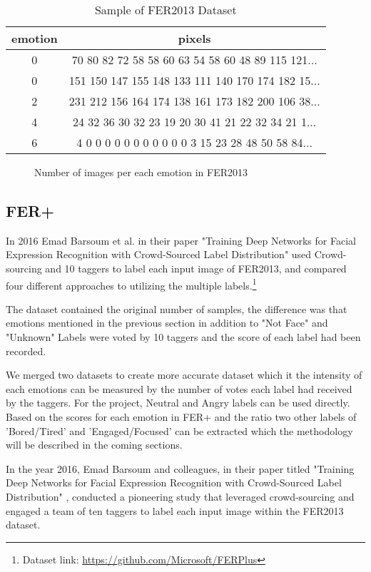 \begin{table}
	\centering
	\caption{Sample of FER2013 Dataset}
	\begin{tabular}{| c | c |}
		
		\hline
		emotion &	pixels \\
		\hline
		0 &	70 80 82 72 58 58 60 63 54 58 60 48 89 115 121... \\ \hline
		0 &	151 150 147 155 148 133 111 140 170 174 182 15... \\ \hline
		2 &	231 212 156 164 174 138 161 173 182 200 106 38... \\ \hline
		4 &	24 32 36 30 32 23 19 20 30 41 21 22 32 34 21 1... \\ \hline
		6 &	4 0 0 0 0 0 0 0 0 0 0 0 3 15 23 28 48 50 58 84... \\ \hline
	\end{tabular}
\end{table}
\begin{figure}
	\centering
	
	\caption{Number of images per each emotion in FER2013}
\end{figure}
\subsection{FER+}
In 2016 Emad Barsoum et al. in their paper "Training Deep Networks for Facial Expression Recognition with Crowd-Sourced Label Distribution"\cite{barsoum2016training} used Crowd-sourcing and 10 taggers to label each input image of FER2013, and compared four different approaches to utilizing the multiple labels.\footnote{Dataset link: \href{https://github.com/Microsoft/FERPlus}{https://github.com/Microsoft/FERPlus}}

The dataset contained the original number of samples, the difference was that emotions mentioned in the previous section in addition to "Not Face" and "Unknown" Labels were voted by 10 taggers and the score of each label had been recorded.

We merged two datasets to create more accurate dataset which it the intensity of each emotions can be measured by the number of votes each label had received by the taggers. For the project, Neutral and Angry labels can be used directly. Based on the scores for each emotion in FER+ and the ratio two other labels of 'Bored/Tired' and 'Engaged/Focused' can be extracted which the methodology will be described in the coming sections.


In the year 2016, Emad Barsoum and colleagues, in their paper titled "Training Deep Networks for Facial Expression Recognition with Crowd-Sourced Label Distribution" \cite{barsoum2016training}, conducted a pioneering study that leveraged crowd-sourcing and engaged a team of ten taggers to label each input image within the FER2013 dataset.

